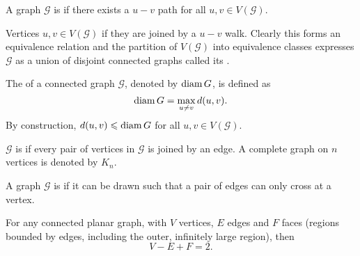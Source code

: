 \begin{definition}[Connectedness]
A graph $\mathcal{G}$ is  if there exists a $u-v$ path for all $u,v\in V(\mathcal{G})$.

Vertices $u,v\in V(\mathcal{G})$  if they are joined by a $u-v$ walk. Clearly this forms an equivalence relation and the partition of $V(\mathcal{G})$ into equivalence classes expresses $\mathcal{G}$ as a union of disjoint connected graphs called its .
\end{definition}

\begin{definition}[Diameter]
The  of a connected graph $\mathcal{G}$, denoted by $\operatorname{diam} G$, is defined as
\[\operatorname{diam} G=\max_{u\neq v}d(u,v).\]
By construction, $d(u,v) \leqslant \operatorname{diam} G$ for all $u,v \in V(\mathcal{G})$.
\end{definition}

\begin{definition}
$\mathcal{G}$ is  if every pair of vertices in $\mathcal{G}$ is joined by an edge. A complete graph on $n$ vertices is denoted by $K_n$.
\end{definition}

\begin{definition}
A graph $\mathcal{G}$ is  if it can be drawn such that a pair of edges can only cross at a vertex.
\end{definition}

\begin{theorem}
For any connected planar graph, with $V$ vertices, $E$ edges and $F$ faces (regions bounded by edges, including the outer, infinitely large region), then
\begin{equation}
V-E+F=2.
\end{equation}
\end{theorem}

